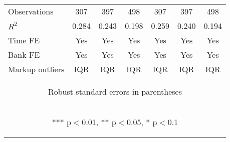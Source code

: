 \documentclass[]{article}
\begin{document}
\begin{center}
\begin{tabular}{lcccccc}
Observations & 307 & 397 & 498 & 307 & 397 & 498 \\
$R^2$ & 0.284 & 0.243 & 0.198 & 0.259 & 0.240 & 0.194 \\
Time FE & Yes & Yes & Yes & Yes & Yes & Yes \\
Bank FE & Yes & Yes & Yes & Yes & Yes & Yes \\
 Markup outliers & IQR & IQR & IQR & IQR & IQR & IQR \\ \hline
\multicolumn{7}{c}{\begin{footnotesize} Robust standard errors in parentheses\end{footnotesize}} \\
\multicolumn{7}{c}{\begin{footnotesize} *** p$<$0.01, ** p$<$0.05, * p$<$0.1\end{footnotesize}} \\
\end{tabular}
\end{center}
\end{document}
